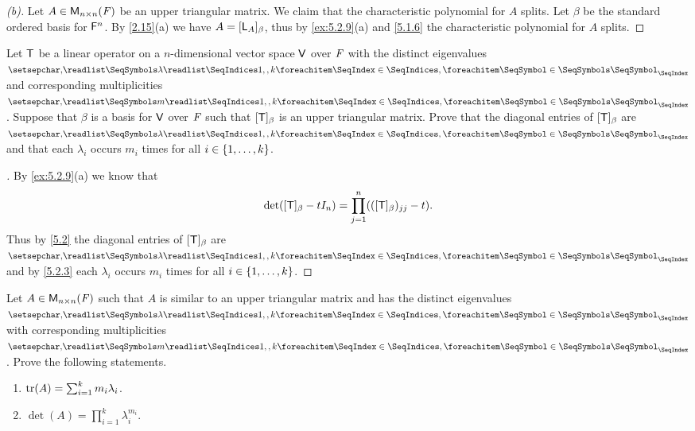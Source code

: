 \begin{proof}[(b)]
	Let \(A \in \mathsf{M}_{{n} \times n}({\mathit{F}})\) be an upper triangular matrix.
	We claim that the characteristic polynomial for \(A\) splits.
	Let \(\beta\) be the standard ordered basis for \(\mathsf{F}^n\).
	By \cref{2.15}(a) we have \(A = [\mathsf{L}_A]_{\beta}\), thus by \cref{ex:5.2.9}(a) and \cref{5.1.6} the characteristic polynomial for \(A\) splits.
\end{proof}

\begin{ex}\label{ex:5.2.10}
	Let \(\mathsf{T}\) be a linear operator on a \(n\)-dimensional vector space \(\mathsf{V}\) over \(\mathit{F}\) with the distinct eigenvalues \(\seq{\lambda}{1,,k}\) and corresponding multiplicities \(\seq{m}{1,,k}\).
	Suppose that \(\beta\) is a basis for \(\mathsf{V}\) over \(\mathit{F}\) such that \([\mathsf{T}]_{\beta}\) is an upper triangular matrix.
	Prove that the diagonal entries of \([\mathsf{T}]_{\beta}\) are \(\seq{\lambda}{1,,k}\) and that each \(\lambda_i\) occurs \(m_i\) times for all \(i \in \left\lbrace1, \dots, k\right\rbrace\).
\end{ex}

\begin{proof}[]
	By \cref{ex:5.2.9}(a) we know that
	\[
		\det([\mathsf{T}]_{\beta} - t I_n) = \prod_{j = 1}^n (([\mathsf{T}]_{\beta})_{j j} - t).
	\]
	Thus by \cref{5.2} the diagonal entries of \([\mathsf{T}]_{\beta}\) are \(\seq{\lambda}{1,,k}\) and by \cref{5.2.3} each \(\lambda_i\) occurs \(m_i\) times for all \(i \in \left\lbrace1, \dots, k\right\rbrace\).
\end{proof}

\begin{ex}\label{ex:5.2.11}
	Let \(A \in \mathsf{M}_{{n} \times n}({\mathit{F}})\) such that \(A\) is similar to an upper triangular matrix and has the distinct eigenvalues \(\seq{\lambda}{1,,k}\) with corresponding multiplicities \(\seq{m}{1,,k}\).
	Prove the following statements.
	\begin{enumerate}
		\item \(\tr(A) = \sum_{i = 1}^k m_i \lambda_i\).
		\item \(\det(A) = \prod_{i = 1}^k \lambda_i^{m_i}\).
	\end{enumerate}
\end{ex}

